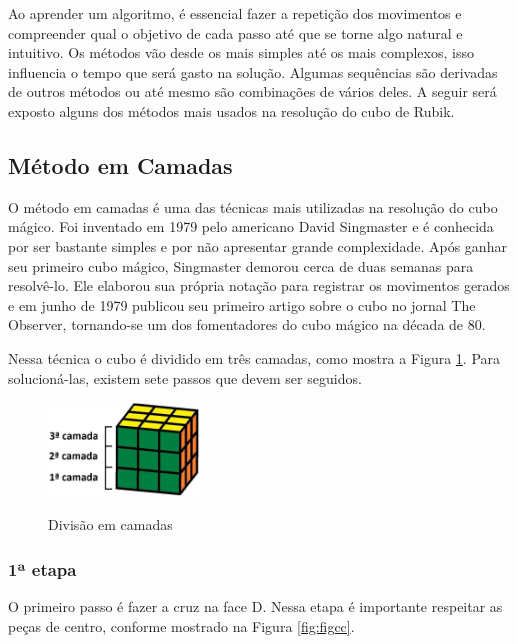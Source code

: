 Ao aprender um algoritmo, é essencial fazer a repetição dos movimentos e compreender qual o objetivo de cada passo até que se torne algo natural e intuitivo. Os métodos vão desde os mais simples até os mais complexos, isso influencia o tempo que será gasto na solução. Algumas sequências são derivadas de outros métodos ou até mesmo são combinações de vários deles. A seguir será exposto alguns dos métodos mais usados na resolução do cubo de Rubik.

\subsection{Método em Camadas}

O método em camadas é uma das técnicas mais utilizadas na resolução do cubo mágico. Foi inventado em 1979 pelo americano David Singmaster e é conhecida por ser  bastante simples e por não apresentar grande complexidade. Após ganhar seu primeiro cubo mágico, Singmaster demorou cerca de duas semanas para resolvê-lo. Ele elaborou sua própria notação para registrar os movimentos gerados e em junho de 1979 publicou seu primeiro artigo sobre o cubo no jornal The Observer, tornando-se um dos fomentadores do cubo mágico na década de 80. 



Nessa técnica o cubo é dividido em três camadas, como mostra a Figura \ref{fig:figconceiCa}. Para solucioná-las, existem sete passos que devem ser seguidos.


\begin{figure}[!htb]
    \centering
    {
        \includegraphics[height=2.5cm]{imagens/conceitoCamadas.jpg}
        \label{figFront}
    }
    
\caption{Divisão em camadas}
\label{fig:figconceiCa}
\end{figure}


    \subsubsection{1ª etapa}

    O primeiro passo é fazer a cruz na face D. Nessa etapa é importante respeitar as peças de centro, conforme mostrado na Figura \ref{fig:figcc}.
    
